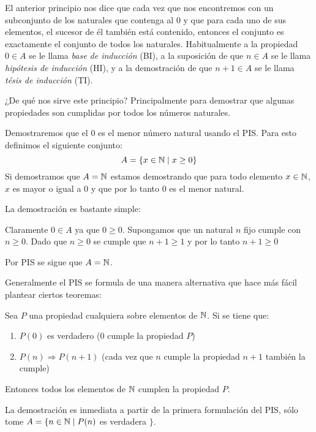 El anterior principio nos dice que cada vez que nos encontremos con un subconjunto de los naturales que contenga al $0$ y que para cada uno de sus elementos, el sucesor de él también está contenido, entonces el conjunto es exactamente el conjunto de todos los naturales.
Habitualmente a la propiedad $0\in A$ se le llama \emph{base de inducción} (BI), a la suposición de que $n\in A$ se le llama \emph{hipótesis de inducción} (HI), y a la demostración de que $n+1\in A$ se le llama \emph{tésis de inducción} (TI).

¿De qué nos sirve este principio?
Principalmente para demostrar que algunas propiedades son cumplidas por todos los números naturales.

\begin{ejemplo}
Demostraremos que el $0$ es el menor número natural usando el PIS.
Para esto definimos el siguiente conjunto:
\[
A=\{x\in\mathbb{N}\;|\;x\geq 0\}
\]
Si demostramos que $A=\mathbb{N}$ estamos demostrando que para todo elemento $x\in\mathbb{N}$, $x$ es mayor o igual a $0$ y que por lo tanto $0$ es el menor natural.

\begin{demostracion}
La demostración es bastante simple:
\begin{inducciondemo}
\BI Claramente $0\in A$ ya que $0\geq 0$.
\HI Supongamos que un natural $n$ fijo cumple con $n\geq 0$.
\TI Dado que $n\geq 0$ se cumple que $n+1\geq 1$ y por lo tanto $n+1\geq 0$
\end{inducciondemo}
Por PIS se sigue que $A=\mathbb{N}$.
\end{demostracion}
\end{ejemplo}

Generalmente el PIS se formula de una manera alternativa que hace más fácil plantear ciertos teoremas:

\begin{teorema}
Sea $P$ una propiedad cualquiera sobre elementos de $\mathbb{N}$.
Si se tiene que:
\begin{enumerate}
\item $P(0)$ es verdadero ($0$ cumple la propiedad $P$)
\item $P(n)\Rightarrow P(n+1)$ (cada vez que $n$ cumple la propiedad $n+1$ también la cumple)
\end{enumerate}
Entonces todos los elementos de $\mathbb{N}$ cumplen la propiedad $P$.

\begin{demostracion}
La demostración es inmediata a partir de la primera formulación del PIS, sólo tome $A=\{n\in\mathbb{N}\;|\; P(n)$ es verdadera $\}$.
\end{demostracion}
\end{teorema}

